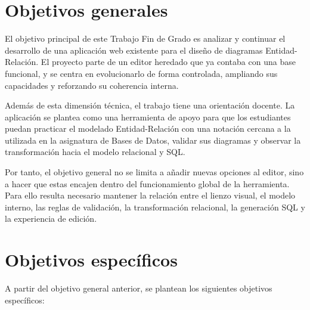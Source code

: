 
\section{Objetivos generales}

El objetivo principal de este Trabajo Fin de Grado es analizar y continuar el desarrollo de una aplicación web existente para el diseño de diagramas Entidad-Relación. El proyecto parte de un editor heredado que ya contaba con una base funcional, y se centra en evolucionarlo de forma controlada, ampliando sus capacidades y reforzando su coherencia interna.

Además de esta dimensión técnica, el trabajo tiene una orientación docente. La aplicación se plantea como una herramienta de apoyo para que los estudiantes puedan practicar el modelado Entidad-Relación con una notación cercana a la utilizada en la asignatura de Bases de Datos, validar sus diagramas y observar la transformación hacia el modelo relacional y SQL.

Por tanto, el objetivo general no se limita a añadir nuevas opciones al editor, sino a hacer que estas encajen dentro del funcionamiento global de la herramienta. Para ello resulta necesario mantener la relación entre el lienzo visual, el modelo interno, las reglas de validación, la transformación relacional, la generación SQL y la experiencia de edición.

\section{Objetivos específicos}

A partir del objetivo general anterior, se plantean los siguientes objetivos específicos:

